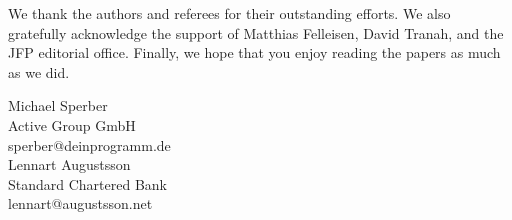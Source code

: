 \documentclass{jfp1}
\begin{document}
We thank the authors and referees for their outstanding efforts.  We also gratefully
acknowledge the support of Matthias Felleisen, David Tranah, and the JFP editorial
office.  Finally, we hope that you enjoy
reading the papers as much as we did.


\begin{flushright}
 Michael Sperber\\
  Active Group GmbH\\
  sperber@deinprogramm.de\\[2mm]
  Lennart Augustsson\\
  Standard Chartered Bank\\
  lennart@augustsson.net
\end{flushright}
\end{document}
